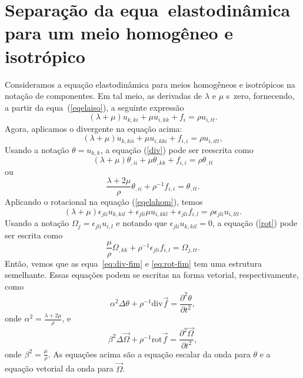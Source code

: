 
\section[Meio homog\^eneo e isotr\'opico]{Separa\c{c}\~ao da equa\cao\
elastodin\^amica para um meio homog\^eneo e isotr\'opico}

Consideramos a equa\c{c}\~ao elastodin\^amica para meios
homog\^eneos e isotr\'opicos na nota\c{c}\~ao de componentes.
Em tal meio, as derivadas de $\lambda$ e $\mu$ s\ao\ zero, fornecendo, a
partir da equa\cao\ (\ref{eqelaiso}), a seguinte express\~ao
\begin{equation}
(\lambda+\mu)u_{k,ki}+\mu u_{i,kk}+f_{i}=\rho u_{i,tt}.
\label{eqelahom}
\end{equation}
Agora, aplicamos o divergente
na equa\c{c}\~ao acima:
\begin{equation}
(\lambda+\mu)u_{k,kii}+\mu u_{i,kki}+f_{i,i}=\rho u_{i,itt},
\label{div}
\end{equation}
Usando a nota\c{c}\~ao $\theta=u_{k,k}$, a equa\c{c}\~ao
(\ref{div}) pode ser reescrita como
\begin{equation}
(\lambda+\mu)\theta_{,ii}+\mu \theta_{,kk}+f_{i,i}=\rho \theta_{,tt} %
\end{equation}
ou
\begin{equation}
\frac{\lambda+2\mu}{\rho}
\theta_{,ii}+\rho^{-1}f_{i,i}=\theta_{,tt}.
\label{eq:div-fim}
\end{equation}
Aplicando o rotacional
na equa\c{c}\~ao (\ref{eqelahom}), temos
\begin{equation}
(\lambda+\mu)\epsilon_{jli}u_{k,kil}+\epsilon_{jli}\mu
u_{i,kkl}+\epsilon_{jli}f_{i,l}=\rho\epsilon_{jli} u_{i,ltt}.
\label{rot}
\end{equation}
Usando a nota\c{c}\~ao $\Omega_{j}=\epsilon_{jli}u_{i,l}$ e
notando que $\epsilon_{jli}u_{k,kil}=0$, a equa\c{c}\~ao
(\ref{rot}) pode ser escrita como
\begin{equation}
\frac{\mu}{\rho}\Omega_{,kk}+\rho^{-1}\epsilon_{jli}f_{i,l}=\Omega_{j,tt}.
\label{eq:rot-fim}
\end{equation}
Ent\~ao, vemos que as equa\coes\ \ref{eq:div-fim} e \ref{eq:rot-fim} tem uma
estrutura semelhante. Essas equa\c{c}\~oes podem se escritas na forma vetorial,
respectivamente, como 
\begin{equation}
\alpha^{2}\Delta\theta+\rho^{-1}\mbox{div}\vec{f}=\frac{\partial^{2} \theta }{\partial t^{2}} ,
\end{equation}
onde $\alpha^{2}=\frac{\lambda+2\mu}{\rho}$, e
\begin{equation}
\beta^{2}\Delta\vec{\Omega}+\rho^{-1}\mbox{rot}\vec{f}=\frac{\partial^{2} \vec{\Omega} }{\partial t^{2}} ,
\end{equation}
onde $\beta^{2}=\frac{\mu}{\rho}$.
As equa\c{c}\~oes acima s\~ao a equa\c{c}\~ao escalar da onda para
$\theta$ e a equa\c{c}\~ao vetorial da onda para $\vec{\Omega}$.

